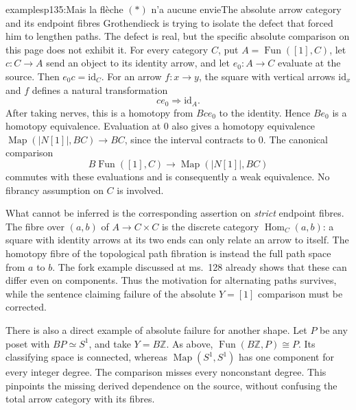 \begin{dcomment}{examples}{p135:Mais la flèche $(*)$ n'a aucune envie}{The absolute arrow category and its endpoint fibres}
Grothendieck is trying to isolate the defect that forced him to lengthen paths. The defect is real, but the specific absolute comparison on this page does not exhibit it. For every category $C$, put $A=\operatorname{Fun}([1],C)$, let $c:C\to A$ send an object to its identity arrow, and let $e_0:A\to C$ evaluate at the source. Then $e_0c=\mathrm{id}_C$. For an arrow $f:x\to y$, the square with vertical arrows $\mathrm{id}_x$ and $f$ defines a natural transformation
\[
                    ce_0\Longrightarrow\mathrm{id}_A.
\]
After taking nerves, this is a homotopy from $Bce_0$ to the identity. Hence $Be_0$ is a homotopy equivalence. Evaluation at $0$ also gives a homotopy equivalence
$\operatorname{Map}(|N[1]|,BC)\to BC$, since the interval contracts to $0$. The canonical comparison
\[
 B\operatorname{Fun}([1],C)
       \longrightarrow\operatorname{Map}(|N[1]|,BC)
\]
commutes with these evaluations and is consequently a weak equivalence. No fibrancy assumption on $C$ is involved.

What cannot be inferred is the corresponding assertion on \emph{strict} endpoint fibres. The fibre over $(a,b)$ of $A\to C\times C$ is the discrete category $\operatorname{Hom}_C(a,b)$: a square with identity arrows at its two ends can only relate an arrow to itself. The homotopy fibre of the topological path fibration is instead the full path space from $a$ to $b$. The fork example discussed at ms.~128 already shows that these can differ even on components. Thus the motivation for alternating paths survives, while the sentence claiming failure of the absolute $Y=[1]$ comparison must be corrected.

There is also a direct example of absolute failure for another shape. Let $P$ be any poset with $BP\simeq S^1$, and take $Y=B\mathbb Z$. As above, $\operatorname{Fun}(B\mathbb Z,P)\cong P$. Its classifying space is connected, whereas $\operatorname{Map}(S^1,S^1)$ has one component for every integer degree. The comparison misses every nonconstant degree. This pinpoints the missing derived dependence on the source, without confusing the total arrow category with its fibres.
\end{dcomment}

